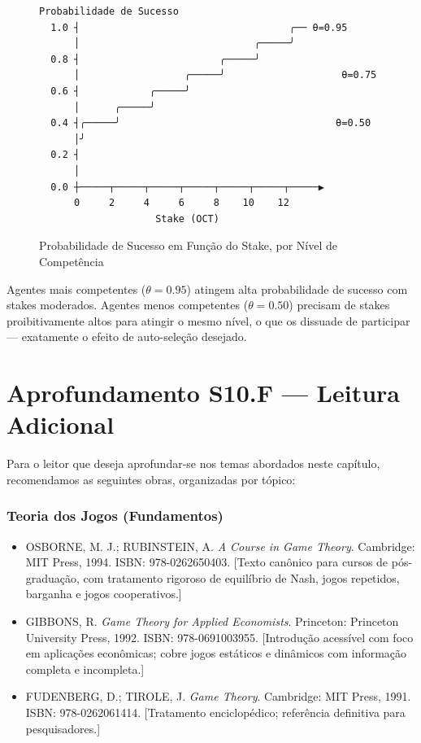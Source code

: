 \begin{figure}[htbp]
\centering
\begin{verbatim}
Probabilidade de Sucesso
  1.0 ┤                                    ╭── θ=0.95
      │                              ╭─────╯
  0.8 ┤                        ╭─────╯
      │                  ╭─────╯                    θ=0.75
  0.6 ┤            ╭─────╯
      │      ╭─────╯
  0.4 ┤╭─────╯                                     θ=0.50
      │╯
  0.2 ┤
      │
  0.0 ┼─────┬─────┬─────┬─────┬─────┬─────┬─────▶
      0     2     4     6     8    10    12
                    Stake (OCT)
\end{verbatim}
\caption{Probabilidade de Sucesso em Função do Stake, por Nível de Competência}
\label{fig:incentive_curve}
\end{figure}

Agentes mais competentes ($\theta=0.95$) atingem alta probabilidade de sucesso com stakes moderados. Agentes menos competentes ($\theta=0.50$) precisam de stakes proibitivamente altos para atingir o mesmo nível, o que os dissuade de participar --- exatamente o efeito de auto-seleção desejado.


\section*{Aprofundamento S10.F --- Leitura Adicional}

Para o leitor que deseja aprofundar-se nos temas abordados neste capítulo, recomendamos as seguintes obras, organizadas por tópico:

\subsubsection*{Teoria dos Jogos (Fundamentos)}

\begin{itemize}
    \item OSBORNE, M. J.; RUBINSTEIN, A. \textit{A Course in Game Theory}. Cambridge: MIT Press, 1994. ISBN: 978-0262650403. [Texto canônico para cursos de pós-graduação, com tratamento rigoroso de equilíbrio de Nash, jogos repetidos, barganha e jogos cooperativos.]
    
    \item GIBBONS, R. \textit{Game Theory for Applied Economists}. Princeton: Princeton University Press, 1992. ISBN: 978-0691003955. [Introdução acessível com foco em aplicações econômicas; cobre jogos estáticos e dinâmicos com informação completa e incompleta.]
    
    \item FUDENBERG, D.; TIROLE, J. \textit{Game Theory}. Cambridge: MIT Press, 1991. ISBN: 978-0262061414. [Tratamento enciclopédico; referência definitiva para pesquisadores.]
\end{itemize}

